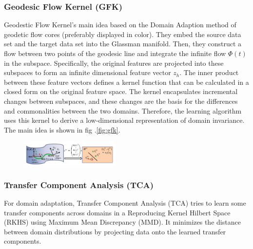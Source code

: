 \documentclass[conference]{IEEEtran}
\begin{document}
\subsubsection{Geodesic Flow Kernel (GFK)}
Geodestic Flow Kernel's\cite{gong2012geodesic} main idea based on the Domain Adaption method of geodetic flow cores (preferably displayed in color). They embed the source data set and the target data set into the Glassman manifold. Then, they construct a flow between two points of the geodesic line and integrate the infinite flow $\Phi(t)$ in the subspace. Specifically, the original features are projected into these subspaces to form an infinite dimensional feature vector $z_h$. The inner product between these feature vectors defines a kernel function that can be calculated in a closed form on the original feature space. The kernel encapsulates incremental changes between subspaces, and these changes are the basis for the differences and commonalities between the two domains. Therefore, the learning algorithm uses this kernel to derive a low-dimensional representation of domain invariance.
The main idea is shown in fig .\ref{fig:gfk}.
\begin{center}
	\begin{figure}[htbp]
		\centering
		\includegraphics[width=5cm]{img/gfk.png}
		\caption{}
	\end{figure}\label{fig:gfk}
\end{center}

\subsubsection{Transfer Component Analysis (TCA)}

For domain adaptation, Transfer Component Analysis (TCA) \cite{Sinno2011Domain} tries to learn some transfer components across domains in a Reproducing Kernel Hilbert Space (RKHS) using Maximum Mean Discrepancy (MMD). It minimizes the distance between domain distributions by projecting data onto the learned transfer components.
\end{document}
